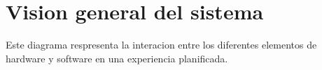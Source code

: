 \section{Vision general del sistema}

Este diagrama respresenta la interacion entre los diferentes elementos de hardware y software en una experiencia planificada.